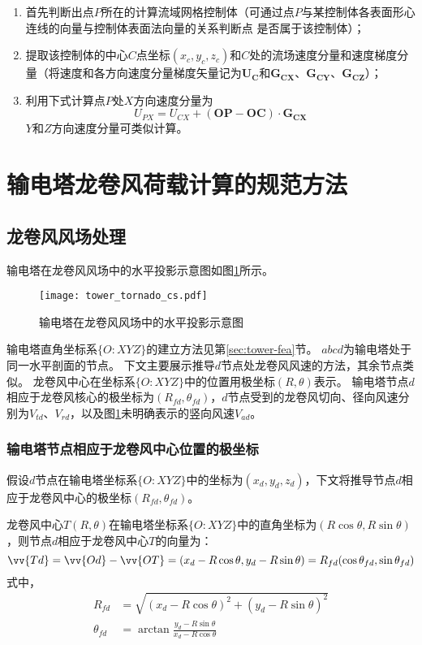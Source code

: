 \begin{enumerate}
	\item
	      首先判断出点$P$所在的计算流域网格控制体（可通过点$P$与某控制体各表面形心连线的向量与控制体表面法向量的关系判断点 是否属于该控制体）；
	\item
	      提取该控制体的中心$C$点坐标$(x_c, y_c, z_c)$和$C$处的流场速度分量和速度梯度分量（将速度和各方向速度分量梯度矢量记为$\bm{U_C}$和$\bm{G_{CX}}$、$\bm{G_{CY}}$、$\bm{G_{CZ}}$）；
	\item
	      利用下式计算点$P$处$X$方向速度分量为
	      \begin{equation}
	      	U_{PX} = U_{CX} + (\bm{OP}-\bm{OC})\cdot \bm{G_{CX}}
	      \end{equation}
	      $Y$和$Z$方向速度分量可类似计算。
\end{enumerate}


\section{输电塔龙卷风荷载计算的规范方法}\label{sec:static-code}

\subsection{龙卷风风场处理}
输电塔在龙卷风风场中的水平投影示意图如图\ref{fig:tower-tornado-cs}所示。
\begin{figure}[!htpb]
	\centering
	\texttt{[image: tower\_tornado\_cs.pdf]}
	\caption{输电塔在龙卷风风场中的水平投影示意图}
	\label{fig:tower-tornado-cs}
\end{figure}
输电塔直角坐标系$\{O: XYZ\}$的建立方法见第\ref{sec:tower-fea}节。
$abcd$为输电塔处于同一水平剖面的节点。
下文主要展示推导$d$节点处龙卷风风速的方法，其余节点类似。
龙卷风中心在坐标系$\{O: XYZ\}$中的位置用极坐标$(R, \theta)$表示。
输电塔节点$d$相应于龙卷风核心的极坐标为$(R_{fd}, \theta_{fd})$，$d$节点受到的龙卷风切向、径向风速分别为$V_{td}$、$V_{rd}$，以及图\ref{fig:tower-tornado-cs}未明确表示的竖向风速$V_{ad}$。

\subsubsection{输电塔节点相应于龙卷风中心位置的极坐标}\label{sec:d-polor}
假设$d$节点在输电塔坐标系$\{O: XYZ\}$中的坐标为$(x_d, y_d, z_d)$，下文将推导节点$d$相应于龙卷风中心的极坐标$(R_{fd}, \theta_{fd})$。

龙卷风中心$T(R, \theta)$在输电塔坐标系$\{O: XYZ\}$中的直角坐标为$(R\cos\theta, R\sin\theta)$，则节点$d$相应于龙卷风中心$T$的向量为：
\begin{equation}
	\vv{Td} = \vv{Od} - \vv{OT} = (x_d - R\cos\theta, y_d - R\sin\theta) = R_{fd}(\cos\theta_{fd}, \sin\theta_{fd})
\end{equation}
式中，
\begin{equation}
	\begin{split}
		R_{fd} & = \sqrt{(x_d-R\cos\theta)^2+(y_d-R\sin\theta)^2} \\
		\theta_{fd} & = \arctan \frac{y_d - R\sin\theta}{x_d - R\cos\theta}
	\end{split}
\end{equation}

